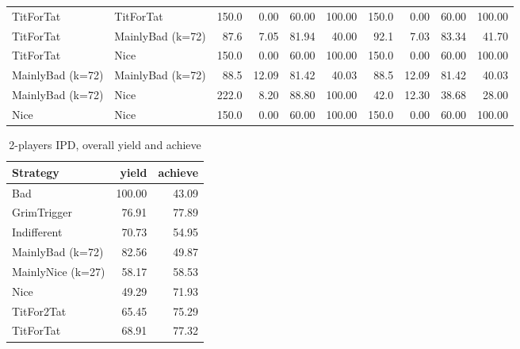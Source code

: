 \documentclass[journal,10pt,twoside]{IEEEtran}
\begin{document}
\begin{table}[ht]
\begin{tabular}{ll|rrrr|rrrr}
		TitForTat         & TitForTat         & 150.0 &  0.00 &  60.00 &     100.00 & 150.0 &  0.00 &  60.00 &     100.00 \\
		TitForTat         & MainlyBad (k=72)  &  87.6 &  7.05 &  81.94 &      40.00 &  92.1 &  7.03 &  83.34 &      41.70 \\
		TitForTat         & Nice              & 150.0 &  0.00 &  60.00 &     100.00 & 150.0 &  0.00 &  60.00 &     100.00 \\
		MainlyBad (k=72)  & MainlyBad (k=72)  &  88.5 & 12.09 &  81.42 &      40.03 &  88.5 & 12.09 &  81.42 &      40.03 \\
		MainlyBad (k=72)  & Nice              & 222.0 &  8.20 &  88.80 &     100.00 &  42.0 & 12.30 &  38.68 &      28.00 \\
		Nice              & Nice              & 150.0 &  0.00 &  60.00 &     100.00 & 150.0 &  0.00 &  60.00 &     100.00 \\ \bottomrule
	\end{tabular}
\end{table}

\begin{table}[ht]
	\caption{2-players IPD, overall yield and achieve}
	\label{tab:ipd2pavg}
	\centering
	\begin{tabular}{l|rr} \toprule
		Strategy          &  yield & achieve \\ \midrule
		Bad               & 100.00 &   43.09 \\
		GrimTrigger       &  76.91 &   77.89 \\
		Indifferent       &  70.73 &   54.95 \\
		MainlyBad (k=72)  &  82.56 &   49.87 \\
		MainlyNice (k=27) &  58.17 &   58.53 \\
		Nice              &  49.29 &   71.93 \\
		TitFor2Tat        &  65.45 &   75.29 \\
		TitForTat         &  68.91 &   77.32 \\ \bottomrule
	\end{tabular}
\end{table}
\end{document}

